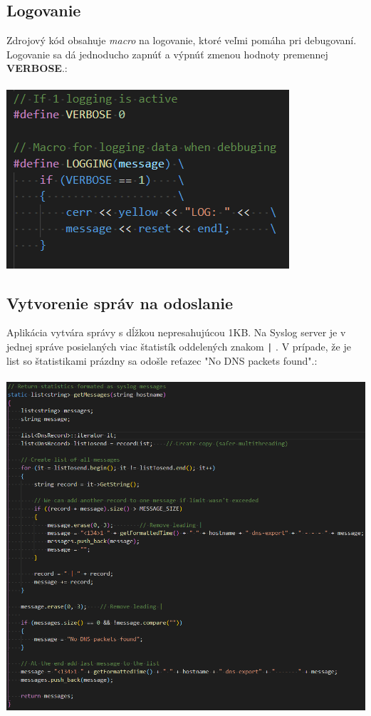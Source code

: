 \documentclass{article}
\begin{document}
        \subsection{Logovanie}
        Zdrojový kód obsahuje \emph{macro} na logovanie, ktoré veľmi pomáha pri debugovaní. Logovanie sa dá jednoducho zapnúť a výpnúť zmenou hodnoty
        premennej \textbf{VERBOSE}.:\\\\
        \includegraphics[scale=0.6]{log.png}

        \newpage

        \subsection{Vytvorenie správ na odoslanie}
        Aplikácia vytvára správy s dĺžkou nepresahujúcou 1KB. Na Syslog server je v jednej správe posielaných viac štatistík oddelených znakom \texttt{|} .
        V prípade, že je list so štatistikami prázdny sa odošle reťazec "No DNS packets found".:\\\\
        \includegraphics[scale=0.6]{messages.png}
\end{document}
